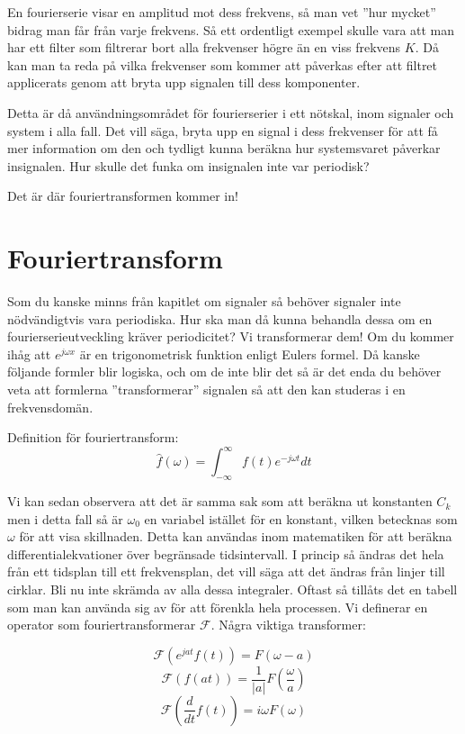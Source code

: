 \documentclass{article}
\begin{document}
En fourierserie visar en amplitud mot dess frekvens, så man vet
''hur mycket'' bidrag man får från varje frekvens.
Så ett ordentligt exempel skulle vara att man har ett filter som
filtrerar bort alla frekvenser högre än en viss frekvens $K$.
Då kan man ta reda på vilka frekvenser som kommer att påverkas
efter att filtret applicerats genom att bryta upp signalen till dess komponenter.

Detta är då användningsområdet för fourierserier i ett nötskal,
inom signaler och system i alla fall.
Det vill säga, bryta upp en signal i dess frekvenser för att få mer
information om den och tydligt kunna beräkna hur systemsvaret påverkar insignalen.
Hur skulle det funka om insignalen inte var periodisk?

Det är där fouriertransformen kommer in!

\section{Fouriertransform}

Som du kanske minns från kapitlet om signaler så behöver signaler
inte nödvändigtvis vara periodiska.
Hur ska man då kunna behandla dessa om en fourierserieutveckling kräver
periodicitet? Vi transformerar dem! Om du kommer ihåg att
$e^{j\omega x}$ är en trigonometrisk funktion enligt Eulers formel.
Då kanske följande formler blir logiska, och om de inte blir det så är det
enda du behöver veta att formlerna ''transformerar'' signalen så att den kan
studeras i en frekvensdomän.

Definition för fouriertransform:
\begin{displaymath}
  \hat{f}(\omega) = \int_{-\infty}^{\infty} f(t) e^{-j \omega t} dt
\end{displaymath}

Vi kan sedan observera att det är samma sak som att beräkna ut konstanten $C_k$
men i detta fall så är $\omega_0$ en variabel istället för en konstant,
vilken betecknas som $\omega$ för att visa skillnaden.
Detta kan användas inom matematiken för att beräkna differentialekvationer
över begränsade tidsintervall. I princip så ändras det hela från ett tidsplan
till ett frekvensplan, det vill säga att det ändras från linjer till cirklar.
Bli nu inte skrämda av alla dessa integraler.
Oftast så tillåts det en tabell som man kan använda sig av för att förenkla
hela processen. Vi definerar en operator som fouriertransformerar $\mathcal{F}$.
Några viktiga transformer:

\begin{displaymath}
  \mathcal{F}(e^{j a t} f(t)) = F(\omega - a) %
\end{displaymath}
\begin{displaymath}
  \mathcal{F}(f(at)) = \frac{1}{|a|}F(\frac{\omega}{a}) %
\end{displaymath}
\begin{displaymath}
  \mathcal{F}(\frac{d}{dt} f(t)) = i\omega F(\omega) %
\end{displaymath}
\end{document}
